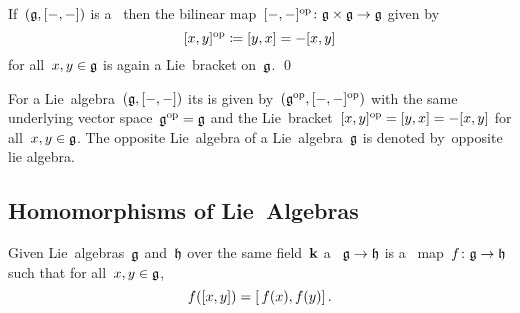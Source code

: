 \begin{lemma}
  If~$(\mathfrak{g}, [-,-])$ is a~{\liealgebra{$\kf$}} then the bilinear map~$[-,-]^{\mathrm{op}} \colon \mathfrak{g} \times \mathfrak{g} \to \mathfrak{g}$ given by
  \[
    [x,y]^{\mathrm{op}}
    \coloneqq
    [y,x]
    =
    -[x,y]
  \]
  for all~$x, y \in \mathfrak{g}$ is again a Lie~bracket on~$\mathfrak{g}$.
  \qed
\end{lemma}


\begin{definition}
  For a Lie~algebra~$(\mathfrak{g}, [-,-])$ its  is given by~$(\mathfrak{g}^{\mathrm{op}}, [-,-]^{\mathrm{op}})$ with the same underlying vector space~$\mathfrak{g}^{\mathrm{op}} = \mathfrak{g}$ and the Lie~bracket~$[x,y]^{\mathrm{op}} = [y,x] = -[x,y]$ for all~$x, y \in \mathfrak{g}$.
  The opposite Lie~algebra of a Lie~algebra~$\mathfrak{g}$ is denoted by~\gls{opposite lie algebra}.
\end{definition}





\subsection{Homomorphisms of Lie~Algebras}


\begin{definition}
 Given Lie~algebras~$\mathfrak{g}$ and~$\mathfrak{h}$ over the same field~$\kf$ a ~$\mathfrak{g} \to \mathfrak{h}$ is a~{\linear{$\kf$}} map~$f \colon \mathfrak{g} \to \mathfrak{h}$ such that for all~$x, y \in \mathfrak{g}$,
 \[
  f([x,y])
  =
  [\, f(x),f(y)]  \,.
 \]
\end{definition}


